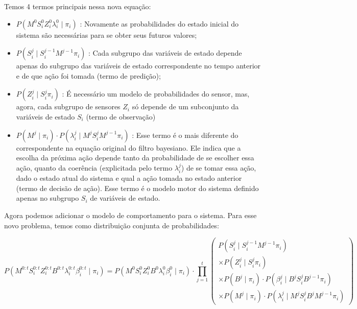 Temos 4 termos principais nessa nova equação:

\begin{itemize}
    \item $ P \left( M^0 S_i^0 Z_i^0 \lambda_i^0 \mid \pi_i \right) $ : Novamente as probabilidades do estado inicial do sistema são necessárias para se obter seus futuros valores;
    \item $ P \left( S_i^j \mid S_i^{j-1} M^{j-1} \pi_i \right) $ : Cada subgrupo das variáveis de estado  depende apenas do subgrupo das variáveis de estado correspondente no tempo anterior e de que ação foi tomada (termo de predição);
    \item $ P \left( Z_i^j \mid S_i^j \pi_i \right) $ : É necessário um modelo de probabilidades do sensor, mas, agora, cada subgrupo de sensores $ Z_i $ só depende de um subconjunto da variáveis de estado $ S_i $ (termo de observação)
    \item $ P \left( M^j \mid \pi_i \right) \cdot P \left( \lambda_i^j \mid M^j S_i^j M^{j-1} \pi_i \right) $ : Esse termo é o mais diferente do correspondente na equação original do filtro bayesiano. Ele indica que a escolha da próxima ação depende tanto da probabilidade de se escolher essa ação, quanto da coerência (explicitada pelo termo $ \lambda_i^j $) de se tomar essa ação, dado o estado atual do sistema e qual a ação tomada no estado anterior (termo de decisão de ação). Esse termo é o modelo motor do sistema definido apenas no subgrupo $ S_i $ de variáveis de estado.
\end{itemize}

Agora podemos adicionar o modelo de comportamento para o sistema. Para esse novo problema, temos como distribuição conjunta de probabilidades: 

\begin{equation}
    P \left( M^{0: t} S_i^{0: t} Z_i^{0: t} B^{0: t} \lambda_i^{0: t} \beta_i^{0: t} \mid \pi_i \right) = P \left( M^0 S_i^0 Z_i^0 B^0 \lambda_i^0 \beta_i^0 \mid \pi_i \right) \cdot \prod\limits_{j =1}^{t} 
        \left(
            \begin{array}{l}
                P \left( S_i^j \mid S_i^{j -1} M^{j-1} \pi_i \right) \\
                \times P \left( Z_i^j \mid S_i^j \pi_i \right) \\
                \times P \left( B^j \mid \pi_i \right) \cdot P \left( \beta_i^j \mid B^j S_i^j B^{j-1} \pi_i \right) \\
                \times P \left( M^j \mid \pi_i \right) \cdot P \left( \lambda_i^j \mid M^j S_i^j B^j M^{j-1} \pi_i \right)
            \end{array}
        \right)
\end{equation}

